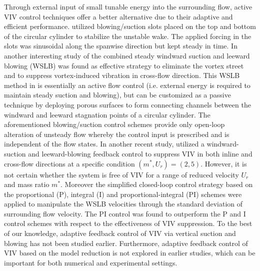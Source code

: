 \documentclass[standard]{jfm}
\begin{document}
Through external input of small tunable energy into the surrounding flow, active VIV control 
techniques offer a better alternative due to their adaptive and efficient performance.
\cite{Kim2005} utilized blowing/suction slots placed on the top and bottom of the circular cylinder to
stabilize the unstable wake. The applied forcing in the slots was sinusoidal along the spanwise direction but kept steady in time.
In another interesting study of \cite{Dong2008} the combined steady windward suction and leeward blowing (WSLB) was found as effective strategy to
eliminate the vortex street and to suppress vortex-induced vibration in cross-flow direction.
%
This WSLB method in \cite{Dong2008} is essentially an active flow control (i.e. external energy 
is required to maintain steady suction and blowing), but can be customized as a passive 
technique by deploying porous surfaces to form connecting channels between the windward
and leeward stagnation points of a circular cylinder.
%
The aforementioned blowing/suction control schemes
provide only open-loop alteration of unsteady flow 
whereby the control input is prescribed and is independent of the flow states.
In another recent study, \cite{Wang2016b} utilized a windward-suction 
and leeward-blowing feedback control to suppress VIV in both inline and cross-flow 
directions at a specific condition $(m^*,U_r)=(2,5)$. 
However, it is not certain whether the system is free of VIV
for a range of reduced velocity $U_r$ and mass ratio $m^*$. 
Moreover the simplified closed-loop control strategy based  on 
the proportional (P), integral (I) and proportional-integral (PI) schemes 
were applied to manipulate the WSLB velocities through the standard 
deviation of surrounding flow velocity. The PI control was found to outperform the 
P and I control schemes with respect to the effectiveness of VIV suppression.
To the best of our knowledge, adaptive feedback control of VIV via vertical suction and blowing 
has not been studied earlier. Furthermore, adaptive feedback control of VIV based on 
the model reduction is not explored in earlier studies, which can be important 
for both numerical and experimental settings. 
\end{document}
